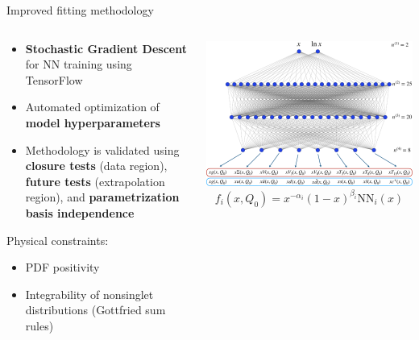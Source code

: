 \documentclass[aspectratio=169,9pt]{beamer}
\begin{document}
\begin{frame}[t]{Improved fitting methodology}
    \begin{columns}[T]
        \begin{column}{0.48\textwidth}
            \begin{itemize}
                \item \textbf{Stochastic Gradient Descent} for NN training using TensorFlow
                \item Automated optimization of \\ \textbf{ model hyperparameters}
                \item Methodology is validated using 
                {\bf closure tests} (data region), {\bf future tests} (extrapolation region), and {\bf parametrization basis independence}
            \end{itemize}
        \vspace*{1em}
        Physical constraints:
        \begin{itemize}
            \item PDF positivity
            \item Integrability of nonsinglet distributions (Gottfried sum rules)
        \end{itemize}
        \end{column}
        \begin{column}{0.48\textwidth}
            \vspace*{-3em}
            \includegraphics[width=1.0\textwidth]{NNarch}
            \begin{equation*}
                f_{i}\left(x, Q_{0}\right)=x^{-\alpha_{i}}(1-x)^{\beta_{i}} \mathrm{NN}_{i}(x)
            \end{equation*}
        \end{column}
    \end{columns}
\end{frame}
\end{document}
